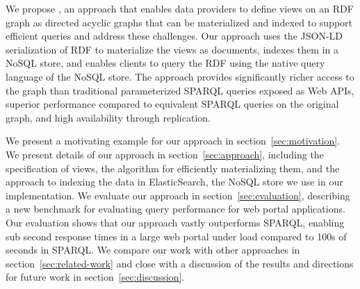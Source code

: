 We propose \ldviews, an approach that enables data providers to define views on an RDF graph as directed acyclic graphs that can be materialized and indexed to support efficient queries and address these challenges.
Our approach uses the JSON-LD serialization of RDF \cite{Lanthaler:2012:UJC:2307819.2307827} to materialize the views as documents, indexes them in a NoSQL store, and enables clients to query the RDF using the native query language of the NoSQL store.
%
The approach provides significantly richer access to the graph than traditional parameterized SPARQL queries exposed as Web APIs, superior performance compared to equivalent SPARQL queries on the original graph, and high availability through replication. 

We present a motivating example for our approach in section~\ref{sec:motivation}.
We present details of our approach in section~\ref{sec:approach}, including the specification of views, the algorithm for efficiently materializing them, and the approach to indexing the data in ElasticSearch, the NoSQL store we use in our implementation.
We evaluate our approach in section~\ref{sec:evaluation}, describing a new benchmark for evaluating query performance for web portal applications. 
Our evaluation shows that our approach vastly outperforms SPARQL, enabling sub second response times in a large web portal under load compared to 100s of seconds in SPARQL.
We compare our work with other approaches in section~\ref{sec:related-work} and close with a discussion of the results and directions for future work in section~\ref{sec:discussion}.
